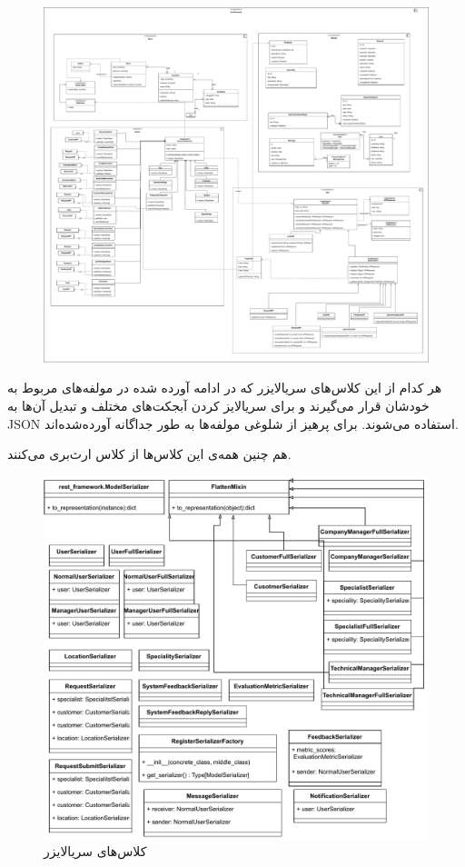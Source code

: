\eject \pdfpagewidth=25in \pdfpageheight=25in

\begin{figure}[ht!]
	\centering
	\includegraphics[scale=0.8]{figs/design-class/front.pdf}
\end{figure}
\FloatBarrier
\newpage

\recalctypearea

هر کدام از این کلاس‌های سریالایزر که در ادامه آورده شده در مولفه‌های مربوط به خودشان قرار می‌گیرند و برای سریالایز کردن آبجکت‌های مختلف و تبدیل آن‌ها به JSON استفاده می‌شوند. برای پرهیز از شلوغی مولفه‌ها به طور جداگانه آورده‌شده‌اند.

هم چنین همه‌ی این کلاس‌ها از کلاس
ارث‌بری می‌کنند.

\begin{figure}[ht!]
	\centering
	\includegraphics[scale=0.8]{figs/design-class/serial.pdf}
	\caption{کلاس‌های سریالایزر}
\end{figure}
\FloatBarrier
\newpage


\recalctypearea
\newpage

